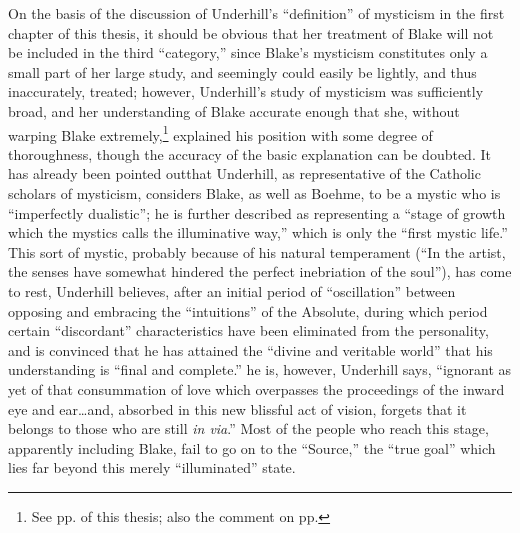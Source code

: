 On the basis of the discussion of Underhill's \enquote{definition} of
mysticism in the first chapter of this thesis, it should
be obvious that her treatment of Blake will not be included in the
third \enquote{category,} since Blake's mysticism constitutes only a small part of her large study, and
seemingly could easily be lightly, and thus inaccurately, treated; however, Underhill's study of
mysticism was sufficiently broad, and her understanding of Blake accurate enough that she, without
warping Blake extremely,\footnote{See pp. \pageref{self:12} of this thesis; also the comment on pp. \pageref{self:13}}
explained his position with some degree of thoroughness, though
the accuracy of the basic explanation can be doubted. It has already been
pointed out\footnotemark[\value{footnote}]
that Underhill, as representative of the Catholic
scholars of mysticism, considers Blake, as well as Boehme, to be a mystic
who is \enquote{imperfectly dualistic}; he is further described as representing a \enquote{stage of growth
which the mystics calls the illuminative way,} which is only the \enquote{first mystic life.}\supercite{underhill:mysticism}
This sort of mystic, probably because of his natural temperament (\enquote{In the artist, the senses have somewhat
hindered the perfect inebriation of the soul}\supercite{underhill:mysticism}), has come to rest, Underhill believes, after an
initial period of \enquote{oscillation} between opposing and embracing the \enquote{intuitions} of the Absolute, during which
period certain \enquote{discordant} characteristics have been eliminated from the personality, and is convinced that he has
attained the \enquote{divine and veritable world} that his understanding is \enquote{final and complete.} he is, however, Underhill
says, \enquote{ignorant as yet of that consummation of love which overpasses the proceedings of the inward eye and
ear\dots and, absorbed in this new blissful act of vision, forgets that it belongs to those who
are still \emph{in via}.}\supercite{underhill:mysticism} Most of the people who reach this stage, apparently
including Blake, fail to go on to the \enquote{Source,}
the \enquote{true goal} which lies far beyond this merely \enquote{illuminated} state.

